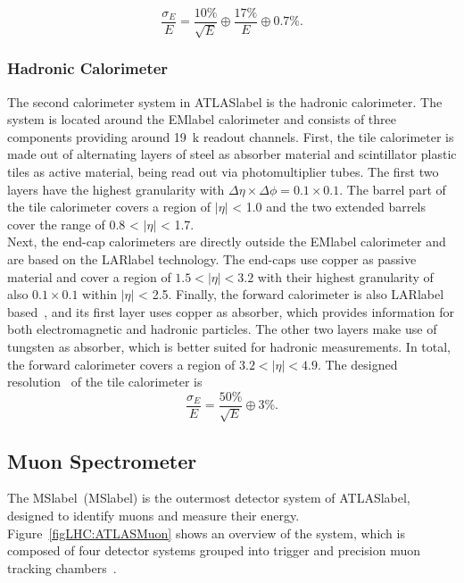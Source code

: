 \begin{equation}
    \frac{\sigma_E}{E} = \frac{10\%}{\sqrt{E}}\oplus\frac{17\%}{E}\oplus 0.7\%.
\end{equation}

\subsubsection*{Hadronic Calorimeter}

The second calorimeter system in \acrshort{ATLASlabel} is the hadronic calorimeter. The system is located around the \acrshort{EMlabel} calorimeter and consists of three components providing around 19~k readout channels. First, the tile calorimeter is made out of alternating layers of steel as absorber material and scintillator plastic tiles as active material, being read out via photomultiplier tubes. The first two layers have the highest granularity with $\Delta\eta\times\Delta\phi= 0.1\times 0.1$. The barrel part of the tile calorimeter covers a region of $|\eta|$ < 1.0 and the two extended barrels cover the range of 0.8 < $|\eta|$ < 1.7.\\

Next, the end-cap calorimeters are directly outside the \acrshort{EMlabel} calorimeter and are based on the \acrshort{LARlabel} technology. The end-caps use copper as passive material and cover a region of $1.5 < |\eta| < 3.2$ with their highest granularity of also $0.1\times 0.1$ within $|\eta|$ < 2.5. Finally, the forward calorimeter is also \acrshort{LARlabel} based~\cite{Artamonov_2008}, and its first layer uses copper as absorber, which provides information for both electromagnetic and hadronic particles. The other two layers make use of tungsten as absorber, which is better suited for hadronic measurements. In total, the forward calorimeter covers a region of $3.2 < |\eta| < 4.9$.
The designed resolution~\cite{Collaboration_2008} of the tile calorimeter is
\begin{equation}
    \frac{\sigma_E}{E} = \frac{50\%}{\sqrt{E}}\oplus 3\%.
\end{equation}


\subsection{Muon Spectrometer}

The \acrlong{MSlabel}~(\acrshort{MSlabel}) is the outermost detector system of \acrshort{ATLASlabel}, designed to identify muons and measure their energy. Figure~\ref{figLHC:ATLASMuon} shows an overview of the system, which is composed of four detector systems grouped into trigger and precision muon tracking chambers~\cite{CERN-LHCC-97-022,muoncommission}.\\


